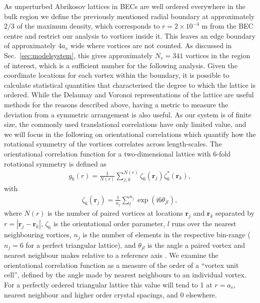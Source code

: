 As unperturbed Abrikosov lattices in BECs are well ordered everywhere in the bulk region \cite{Vtx:Anglin_arxiv_2002} we define the previously mentioned radial boundary at approximately $2/3$ of the maximum density, which corresponds to $r=2\times 10^{-4}$ m from the BEC centre and restrict our analysis to vortices inside it. This leaves an edge boundary of approximately $4a_v$ wide where vortices are not counted. As discussed in Sec.~\ref{sec:modelsystem}, this gives approximately $N_v=341$ vortices in the region of interest, which is a sufficient number for the following analysis. Given the coordinate locations for each vortex within the boundary, it is possible to calculate statistical quantities that characterised the degree to which the lattice is ordered. While the Delaunay and Voronoi representations of the lattice are useful methods for the reasons described above, having a metric to measure the deviation from a symmetric arrangement is also useful. As our system is of finite size, the commonly used translational correlations have only limited value, and we will focus in the following on orientational correlations which quantify how the rotational symmetry of the vortices correlates across length-scales. The orientational correlation function for a two-dimensional lattice with 6-fold rotational symmetry is defined as
\begin{align}
	g_6(r) = \frac{1}{N(r)}\displaystyle\sum\limits_{j,k}^{N(r)}\zeta_6(\mathbf{r}_j)\zeta_6^{*}(\mathbf{r}_k),
\end{align}
with
\begin{align}
	\zeta_6(\mathbf{r}_{j}) =  \frac{1}{n_j}\displaystyle\sum\limits_{l}^{n_j}\exp(\mathrm{i}6\theta_{jl}),
\end{align}
where $N(r)$ is the number of paired vortices at locations $\mathbf{r}_j$ and $\mathbf{r}_k$ separated by $r=|\mathbf{r}_j - \mathbf{r}_k|$, $\zeta_6$ is the orientational order parameter, $l$ runs over the nearest neighbouring vortices, $n_j$ is the number of elements in the respective bin-range ($n_j=6$ for a perfect triangular lattice), and $\theta_{jl}$ is the angle a paired vortex and nearest neighbour makes relative to a reference axis \cite{Guillamon_nat_2014}. We examine the orientational correlation function as a measure of the order of a ``vortex unit cell'', defined by the angle made by nearest neighbours to an individual vortex. For a perfectly ordered triangular lattice this value will tend to 1 at $r=a_v$,  nearest neighbour and higher order crystal spacings, and 0 elsewhere.

